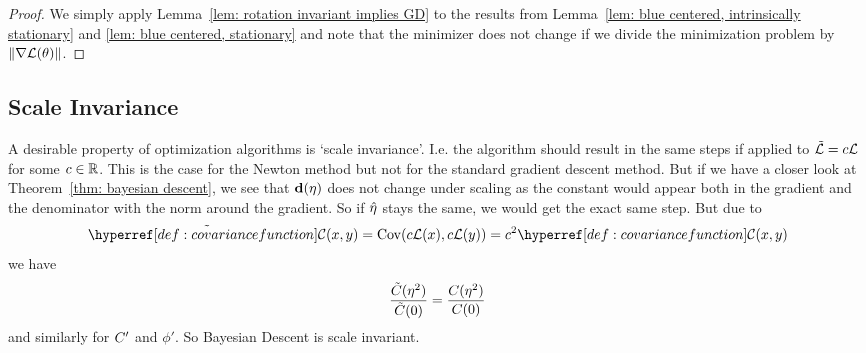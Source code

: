 

\begin{proof}
	We simply apply Lemma~\ref{lem: rotation invariant implies GD}	to the results
	from Lemma~\ref{lem: blue centered, intrinsically stationary} and \ref{lem:
	blue centered, stationary} and note that the minimizer does not change if
	we divide the minimization problem by \(\|\nabla\mathcal{L}(\theta)\|\).
\end{proof}

\subsection{Scale Invariance}

A desirable property of optimization algorithms is `scale invariance'. I.e.
the algorithm should result in the same steps if applied to
\(\tilde{\mathcal{L}}=c\mathcal{L}\) for some \(c\in\mathbb{R}\). This is the case for the
Newton method but not for the standard gradient descent method. But if we have
a closer look at Theorem~\ref{thm: bayesian descent}, we see that
\(\mathbf{d}(\eta)\) does not change under scaling as the constant would appear both
in the gradient and the denominator with the norm around the gradient. So
if \(\hat{\eta}\) stays the same, we would get the exact same step. But
due to
\begin{equation*}
	\tilde{\C}(x,y) = \Cov(c\Loss(x), c\Loss(y)) = c^2 \C(x,y)
\end{equation*}
we have
\begin{equation*}
	\frac{\tilde{C}(\eta^2)}{\tilde{C}(0)}=\frac{C(\eta^2)}{C(0)}
\end{equation*}
and similarly for \(C'\) and \(\phi'\). So Bayesian Descent is scale
invariant.

